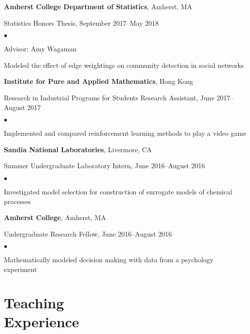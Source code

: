 \documentclass[margin,centered]{res}
\newenvironment{list1}{
  \begin{list}{\ding{113}}{%
      \setlength{\itemsep}{0in}
      \setlength{\parsep}{0in} \setlength{\parskip}{0in}
      \setlength{\topsep}{0in} \setlength{\partopsep}{0in}
      \setlength{\leftmargin}{0.17in}}}{\end{list}}
\newenvironment{list2}{
  \begin{list}{$\bullet$}{%
      \setlength{\itemsep}{0in}
      \setlength{\parsep}{0in} \setlength{\parskip}{0in}
      \setlength{\topsep}{0in} \setlength{\partopsep}{0in}
      \setlength{\leftmargin}{0.2in}}}{\end{list}}
\begin{document}
\begin{resume}
{\bf Amherst College Department of Statistics}, Amherst, MA
\begin{list1}
\item[] 
Statistics Honors Thesis, September 2017--May 2018
\begin{list2}
\vspace*{.05in}
\item
Advisor: Amy Wagaman
\item Modeled the effect of edge weightings on community detection in social networks
\end{list2} 
\end{list1}


{\bf Institute for Pure and Applied Mathematics}, Hong Kong
\begin{list1}
\item[] 
Research in Industrial Programs for Students Research Assistant, June 2017--August 2017
\begin{list2}
\vspace*{.05in}
\item
Implemented and compared reinforcement learning methods to play a video game
\end{list2} 
\end{list1}

{\bf Sandia National Laboratories}, Livermore, CA
\begin{list1}
\item[] 
Summer Undergraduate Laboratory Intern, June 2016--August 2016
\begin{list2}
\vspace*{.05in}
\item
Investigated model selection for construction of surrogate models of chemical processes
\end{list2} 
\end{list1}

{\bf Amherst College}, Amherst, MA
\begin{list1}
\item[] 
Undergraduate Research Fellow, June 2016--August 2016
\begin{list2}
\vspace*{.05in}
\item
Mathematically modeled decision making with data from a psychology experiment
\end{list2} 
\end{list1}


\section{\sc Teaching \\ Experience}


\end{resume}
\end{document}
